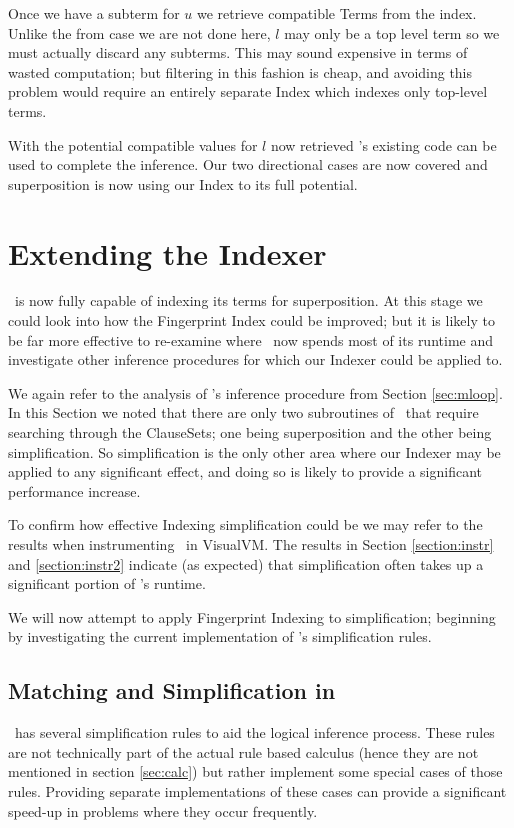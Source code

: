 Once we have a subterm for $u$ we retrieve compatible Terms from the index.
Unlike the from case we are not done here, $l$ may only be a top level term
so we must actually discard any subterms. This may sound expensive in terms
of wasted computation; but filtering in this fashion is cheap, and avoiding this
problem would require an entirely separate Index which indexes only top-level terms.
 
With the potential compatible values for $l$ now retrieved \beagle's existing code
can be used to complete the inference. Our two directional cases are now
covered and superposition is now using our Index to its full potential.

\section{Extending the Indexer}
\label{sec:simp}

\Beagle\ is now fully capable of indexing its terms for superposition. At this stage
we could look into how the Fingerprint Index could be improved; but it is likely
to be far more effective to re-examine where \beagle\ now spends most of its runtime
and investigate other inference procedures for which our Indexer could be applied to. 

We again refer to the analysis of \beagle's inference procedure from Section \ref{sec:mloop}.
In this Section we noted that there are only two subroutines of \beagle\ that require
searching through the ClauseSets; one being superposition and the other being simplification.
So simplification is the only other area where our Indexer may be applied to
any significant effect, and doing so is likely to provide a significant performance
increase.

To confirm how effective Indexing simplification could be we may refer to the results when
instrumenting \beagle\ in VisualVM. The results in Section \ref{section:instr} and \ref{section:instr2}
indicate (as expected) that simplification often takes up a significant portion
of \beagle's runtime.

We will now attempt to apply Fingerprint Indexing to simplification; beginning
by investigating the current implementation of \beagle's simplification rules. 

\subsection{Matching and Simplification in \Beagle}
\label{sec:simprules}
\Beagle\ has several simplification rules to aid the logical inference process.
These rules are not technically part of the actual rule based calculus
(hence they are not mentioned in section \ref{sec:calc}) but rather
implement some special cases of those rules. Providing separate implementations
of these cases can provide a significant speed-up in problems where they occur
frequently.

